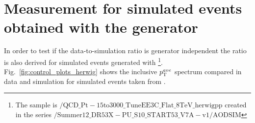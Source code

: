 \section{Measurement for simulated events obtained with the \herwig generator} 
\label{sec:jer_result_herwig}
In order to test if the data-to-simulation ratio is generator independent the ratio is also derived for simulated events generated with \herwig \footnote{The \herwig sample is $\mathrm{/QCD\_Pt-15to3000\_TuneEE3C\_Flat\_8TeV\_herwigpp}$ created in the series $\mathrm{/Summer12\_DR53X-PU\_S10\_START53\_V7A-v1/AODSIM}$}.\\
Fig.~\ref{fig:control_plots_herwig} shows the inclusive $p_{\text{T}}^{ave}$ spectrum compared in data and simulation for simulated events taken from \herwig. \\

